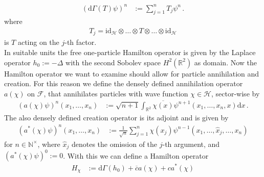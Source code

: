 \begin{align*}
  (\mathrm{d}\Gamma(T)\psi)^{n}
  &:=
  \sum_{j = 1}^{n}
  T_{j}
  \psi^{n}
  \,.
\end{align*}
where
\begin{align*}
  T_{j}
  =
  \mathrm{id}_{\mathcal{H}}
  \otimes
  \dots
  \otimes
  T
  \otimes
  \dots
  \otimes
  \mathrm{id}_{\mathcal{H}}
\end{align*}
is $T$ acting on the $j$-th factor.
\\
In suitable units the free one-particle Hamilton operator is given by the Laplace operator $h_{0} := -\Delta$ with the second Sobolev space $H^{2}(\mathbb{R}^{2})$ as domain. Now the Hamilton operator we want to examine should allow for particle annihilation and creation. For this reason we define the densely defined annihilation operator $a(\chi)$ on $\mathcal{F}$, that annihilates particles with wave function $\chi \in \mathcal{H}$, sector-wise by
\begin{align*}
  (a(\chi)\psi)^{n}
  \left(
    x_{1}
    ,
    \dots
    ,
    x_{n}
  \right)
  &:=
  \sqrt{n + 1}
  \int_{\mathbb{R}^{2}}
  \overline{\chi(x)}
  \psi^{n + 1}
  \left(
    x_{1}
    ,
    \dots
    ,
    x_{n}
    ,
    x
  \right)
  \mathrm{d}x
  \,.
\end{align*}
The also densely defined creation operator is its adjoint and is given by
\begin{align*}
  (a^{\ast}(\chi)\psi)^{n}
  \left(
    x_{1}
    ,
    \dots
    ,
    x_{n}
  \right)
  &:=
  \frac{1}{\sqrt{n}}
  \sum_{j = 1}^{n}
  \chi(x_{j})
  \psi^{n - 1}
  \left(
    x_{1}
    ,
    \dots
    ,
    \hat{x}_{j}
    ,
    \dots,x_{n}
  \right)
\end{align*}
for $n \in \mathbb{N}^{\times}$, where $\hat{x}_{j}$ denotes the omission of the $j$-th argument, and $(a^{\ast}(\chi)\psi)^{0} := 0$. With this we can define a Hamilton operator
\begin{align}
\label{hamchi}
  H_{\chi}
  &:=
  \mathrm{d}\Gamma(h_{0})
  +
  \overline{c}
  a(\chi)
  +
  c
  a^{\ast}(\chi)
\end{align}
